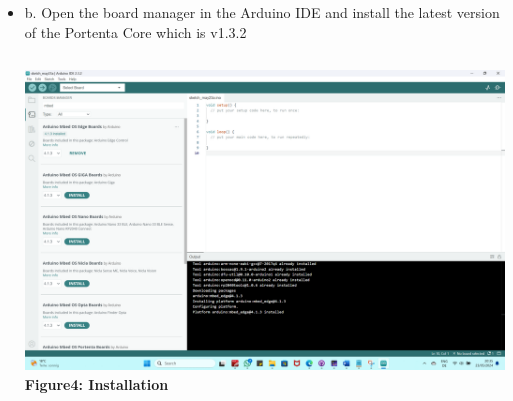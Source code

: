 \documentclass[10pt, a4paper]{beamer}
\begin{document}
	\begin{frame}
		
		\begin{itemize}
			
			\item {b. Open the board manager in the Arduino IDE and install the latest version of the Portenta Core which is v1.3.2}
				
				\begin{columns}
					\centering
					\includegraphics[width=\textwidth]{images/Portenta Core.png}
					\vspace{0.2cm}
					\textbf{Figure4: Installation}
				\end{columns}
			
		\end{itemize}
	\end{frame}
	
\end{document}
